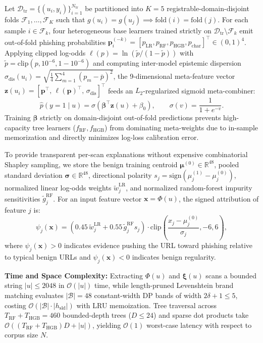 \documentclass[conference]{IEEEtran}
\begin{document}
Let $\mathcal{D}_{\text{tr}} = \{(u_i, y_i)\}_{i=1}^{N_{\text{tr}}}$ be partitioned into $K=5$ registrable-domain-disjoint folds $\mathcal{F}_1, \dots, \mathcal{F}_K$ such that $g(u_i) = g(u_j) \implies \text{fold}(i) = \text{fold}(j)$. For each sample $i \in \mathcal{F}_k$, four heterogeneous base learners trained strictly on $\mathcal{D}_{\text{tr}} \setminus \mathcal{F}_k$ emit out-of-fold phishing probabilities $\mathbf{p}^{(-k)}_i = [p_{\text{LR}}, p_{\text{RF}}, p_{\text{HGB}}, p_{\text{char}}]^\top \in (0,1)^4$. Applying clipped log-odds $\ell(p) = \ln(\tilde{p}/(1-\tilde{p}))$ with $\tilde{p} = \text{clip}(p, 10^{-6}, 1-10^{-6})$ and computing inter-model epistemic dispersion $\sigma_{\text{dis}}(u_i) = \sqrt{\frac{1}{4}\sum_{m=1}^4 (p_m - \bar{p})^2}$, the 9-dimensional meta-feature vector $\mathbf{z}(u_i) = [\mathbf{p}^\top,\, \ell(\mathbf{p})^\top,\, \sigma_{\text{dis}}]^\top$ feeds an $L_2$-regularized sigmoid meta-combiner:
\begin{equation}
\hat{p}(y=1 \mid u) = \sigma\!\left(\boldsymbol{\beta}^\top \mathbf{z}(u) + \beta_0\right), \qquad \sigma(v) = \frac{1}{1 + e^{-v}}.
\label{eq:stack}
\end{equation}
Training $\boldsymbol{\beta}$ strictly on domain-disjoint out-of-fold predictions prevents high-capacity tree learners ($f_{\text{RF}}, f_{\text{HGB}}$) from dominating meta-weights due to in-sample memorization and directly minimizes log-loss calibration error.

To provide transparent per-scan explanations without expensive combinatorial Shapley sampling, we store the benign training centroid $\boldsymbol{\mu}^{(0)} \in \mathbb{R}^{48}$, pooled standard deviation $\boldsymbol{\sigma} \in \mathbb{R}^{48}$, directional polarity $s_j = \text{sign}(\mu_j^{(1)} - \mu_j^{(0)})$, normalized linear log-odds weights $\tilde{w}_j^{\text{LR}}$, and normalized random-forest impurity sensitivities $\tilde{g}_j^{\text{RF}}$. For an input feature vector $\mathbf{x} = \Phi(u)$, the signed attribution of feature $j$ is:
\begin{equation}
\psi_j(\mathbf{x}) = \left(0.45\,\tilde{w}_j^{\text{LR}} + 0.55\,\tilde{g}_j^{\text{RF}} s_j\right) \cdot \text{clip}\!\left(\frac{x_j - \mu_j^{(0)}}{\sigma_j}, -6, 6\right),
\label{eq:attr}
\end{equation}
where $\psi_j(\mathbf{x}) > 0$ indicates evidence pushing the URL toward phishing relative to typical benign URLs and $\psi_j(\mathbf{x}) < 0$ indicates benign regularity.

\textbf{Time and Space Complexity:} Extracting $\Phi(u)$ and $\boldsymbol{\xi}(u)$ scans a bounded string $|u| \le 2048$ in $\mathcal{O}(|u|)$ time, while length-pruned Levenshtein brand matching evaluates $|\mathcal{B}|=48$ constant-width DP bands of width $2\delta+1 \le 5$, costing $\mathcal{O}(|\mathcal{B}| \cdot |h_{\text{sld}}|)$ with LRU memoization. Tree traversal across $T_{\text{RF}}+T_{\text{HGB}} = 460$ bounded-depth trees ($D \le 24$) and sparse dot products take $\mathcal{O}((T_{\text{RF}}+T_{\text{HGB}})D + |u|)$, yielding $\mathcal{O}(1)$ worst-case latency with respect to corpus size $N$.
\end{document}
